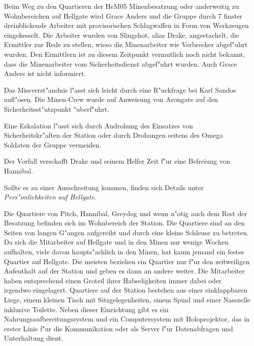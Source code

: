 
Beim Weg zu den Quartieren der HeM05 Minenbesatzung oder anderweitig zu Wohnbereichen auf Hellgate wird Grace Anders und die Gruppe durch 7 finster dreinblickende Arbeiter mit provisorischen Schlagwaffen in Form von Werkzeugen eingekesselt. Die Arbeiter wurden von Slingshot, alias Drake, angestachelt, die Ermittler zur Rede zu stellen, wieso die Minenarbeiter wie Verbrecher abgef"uhrt wurden. Den Ermittlern ist zu diesem Zeitpunkt vermutlich noch nicht bekannt, dass die Minenarbeiter vom Sicherheitsdienst abgef"uhrt wurden. Auch Grace Anders ist nicht informiert.

\begin{remarks}
	Das Missverst"andnis l"asst sich leicht durch eine R"uckfrage bei Karl Sandos aufl"osen. Die Minen-Crew wurde auf Anweisung von Arongate auf den Sicherheitsst"utzpunkt "uberf"uhrt.
	
	Eine Eskalation l"asst sich durch Androhung des Einsatzes von Sicherheitskr"aften der Station oder durch Drohungen seitens des Omega Soldaten der Gruppe vermeiden. 

	Der Vorfall verschafft Drake und seinem Helfer Zeit f"ur eine Befreiung von Hannibal.
	
	Sollte es zu einer Ausschreitung kommen, finden sich Details unter \emph{Pers"onlichkeiten auf Hellgate}.
\end{remarks}


Die Quartiere von Pitch, Hannibal, Greydog und wenn n"otig auch dem Rest der Besatzung befinden sich im Wohnbereich der Station. Die Quartiere sind an den Seiten von langen G"angen aufgereiht und durch eine kleine Schleuse zu betreten. Da sich die Mitarbeiter auf Hellgate und in den Minen nur wenige Wochen aufhalten, viele davon haupts"achlich in den Minen, hat kaum jemand ein festes Quartier auf Hellgate. Die meisten beziehen ein Quartier nur f"ur den zeitweiligen Aufenthalt auf der Station und geben es dann an andere weiter. Die Mitarbeiter haben entsprechend einen Gro\3teil ihrer Habseligkeiten immer dabei oder irgendwo eingelagert. Quartiere auf der Station bestehen aus einer einklappbaren Liege, einem kleinen Tisch mit Sitzgelegenheiten, einem Spind und einer Nasszelle inklusive Toilette. Neben dieser Einrichtung gibt es ein Nahrungsaufbereitungssystem und ein Computersystem mit Holoprojektor, das in erster Linie f"ur die Kommunikation oder als Server f"ur Datenabfragen und Unterhaltung dient.

